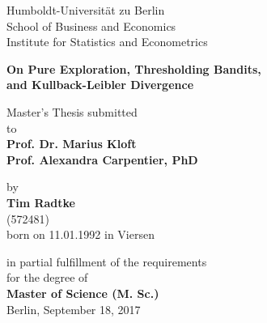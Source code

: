 \documentclass[11pt,]{article}
\title{}
\author{}
\date{}
\begin{document}

\begin{centering}

\vspace{5cm}


    {\Large Humboldt-Universit\"at zu Berlin \\
    School of Business and Economics \\
    Institute for Statistics and Econometrics\\} 
    
    \vspace{4cm}

{\huge{\bf On Pure Exploration, Thresholding Bandits, \\
and Kullback-Leibler Divergence\\}} 

\vspace{2cm}


{\large Master's Thesis submitted\\\vspace{0.5cm}
    to}
    \\\vspace{0.5cm}
    {\large{\bf Prof. Dr. Marius Kloft \\}}
    {\large{\bf Prof. Alexandra Carpentier, PhD \\}}
    \vspace{0.5cm}


    {\large by \\\vspace{0.5cm}
    {\bf Tim Radtke\\}
    (572481)\\
    born on 11.01.1992 in Viersen \\\vspace{1cm}}
    


    {\large in partial fulfillment of the requirements \\
    for the degree of \\
    {\bf Master of Science (M. Sc.)\\} \vspace{3cm}
    Berlin, September 18, 2017\\}

\end{centering}

\newpage

\vspace*{10\baselineskip}
\end{document}
